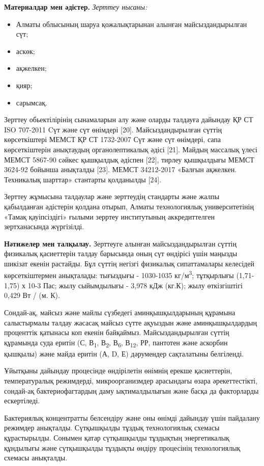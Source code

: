 {{\bfseries Материалдар мен әдістер.} \emph{Зерттеу нысаны:}

\begin{itemize}
\item
  Алматы облысының шаруа қожалықтарынан алынған майсыздандырылған сүт;
\item
  аскөк;
\item
  ақжелкен;
\item
  қияр;
\item
  сарымсақ.
\end{itemize}

Зерттеу обьектілірінің сынамаларын алу және оларды талдауға дайындау ҚР
СТ ISO 707-2011 Cүт және сүт өнімдері {[}20{]}. Майсыздандырылған сүттің
көрсеткіштері МЕМСТ ҚР СТ 1732-2007 Сүт және сүт өнімдері, сапа
көрсеткіштерін анықтаудың органолептикалық әдісі {[}21{]}. Майдың
массалық үлесі МЕМСТ 5867-90 сәйкес қышқылдық әдіспен {[}22{]}, тирлеу
қышқылдығы МЕМСТ 3624-92 бойынша анықталды {[}23{]}. МЕМСТ 34212-2017
«Балғын ақжелкен. Техникалық шарттар» стантарты қолданылды {[}24{]}.

Зерттеу жұмысына талдаулар және зерттеудің стандарты және жалпы
қабылданған әдістерін қолдана отырып, Алматы технологиялық
университетінің «Тамақ қауіпсіздігі» ғылыми зерртеу институтының
аккредиттелген зертханасында жүргізілді.

{\bfseries Нәтижелер мен талқылау.} Зерттеуге алынған майсыздандырылған
сүттің физикалық қасиеттерін талдау барысында оның сүт өндірісі үшін
маңызды шикізат екенін растайды. Бұл сүттің негізгі физикалық
сипаттамалары келесідей көрсеткіштермен анықталады: тығыздығы -
1030-1035 кг/м\textsuperscript{3}; тұтқырлығы (1,71-1,75) х 10-3 Пас;
жылу сыйымдылығы - 3,978 кДж (кг.К); жылу өткізгіштігі 0,429 Вт / (м.
К).

Сондай-ақ, майсыз және майлы сүзбедегі аминқышқылдарының құрамына
салыстырмалы талдау жасасақ майсыз сүтте ақуыздын және аминқышқылдардың
проценттік қатынасы коп екенін байқаймыз. Майсыздандырылған сүттің
құрамында суда еритін (С, В\textsubscript{1}, В\textsubscript{2},
В\textsubscript{6}, В\textsubscript{12}, РР, пантотен және аскорбин
қышқылы) және майда еритін (А, D, Е) дәрумендер сақталатыны белгіленді.

Ұйытқыны дайындау процесінде өндірілетін өнімнің ерекше қасиеттерін,
температуралық режимдерді, микроорганизмдер арасындағы өзара
әрекеттестікті, сондай-ақ бактериофагтардың даму ықтималдылығын және
басқа да факторларды ескертіледі.

Бактериялық концентратты белсендіру және оны өнімді дайындау үшін
пайдалану режимдер анықталды. Сүтқышқылды тұздық технологиялық схемасы
құрастырылды. Сонымен қатар сүтқышқылды тұздықтың энергетикалық
құндылығы және сүтқышқылды тұздықты өндіру процесінің технологиялық
схемасы анықталды.

}
